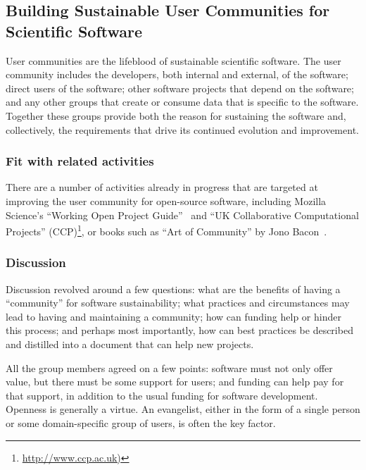 \subsection{Building Sustainable User Communities for Scientific Software}


User communities are the lifeblood of sustainable scientific software. The user
community includes the developers, both internal and external, of the software;
direct users of the software; other software projects that depend on the
software; and any other groups that create or consume data that is specific to
the software. Together these groups provide both the reason for sustaining the
software and, collectively, the requirements that drive its continued evolution
and improvement.

\subsubsection{Fit with related activities}

There are a number of activities already in progress that are targeted at improving
the user community for open-source software, including Mozilla Science's ``Working Open Project
Guide''~\cite{working-open-wssspe3} and
``UK Collaborative Computational Projects'' (CCP)\footnote{\url{http://www.ccp.ac.uk)}}, or 
 books such as ``Art of Community'' by Jono Bacon~\cite{art-of-community}. 

\subsubsection{Discussion}

Discussion revolved around a few questions: what are the benefits of having a
``community'' for software sustainability; what practices and circumstances may lead
to having and maintaining a community; how can funding help or hinder this
process; and perhaps most importantly, how can best practices be described and
distilled into a document that can help new projects.

All the group members agreed on a few points: software must not only offer value, but there
must be some support for users; and funding can help pay for that support, in
addition to the usual funding for software development. Openness is generally 
a virtue. An evangelist, either in the form of a single person or some
domain-specific group of users, is often the key factor.

